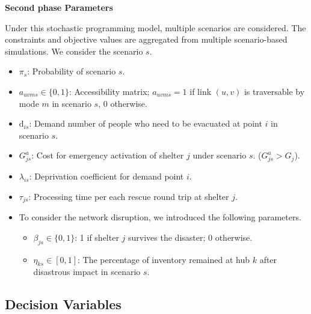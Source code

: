{\textbf{Second phase Parameters}

Under this stochastic programming model, multiple scenarios are considered. The constraints and objective values are aggregated from multiple scenario-based simulations. We consider the scenario $s$.

\begin{itemize}
    \item $\pi_s$: Probability of scenario $s$.
    \item $a_{uvms} \in \{0,1\}$: Accessibility matrix; $a_{uvms} = 1$ if link $(u,v)$ is traversable by mode $m$ in scenario $s$, $0$ otherwise.
    \item $\text{d}_{is}$: Demand number of people who need to be evacuated at point $i$ in scenario $s$.
    \item $G_{js}^{a}$: Cost for emergency activation of shelter $j$ under scenario $s$. ($G_{js}^{a} > G_j$).
    \item $\lambda_{is}$: Deprivation coefficient for demand point $i$.
    \item $\tau_{js}$: Processing time per each rescue round trip at shelter $j$.
    \item To consider the network disruption, we introduced the following parameters.
    \begin{itemize}
        \item[] $\beta_{js} \in \{0,1\}$: 1 if shelter $j$ survives the disaster; 0 otherwise.
        \item[] $\eta_{ks} \in [0,1]$: The percentage of inventory remained at hub $k$ after disastrous impact in scenario $s$. 
    \end{itemize}
\end{itemize}

\subsection*{Decision Variables}

}

